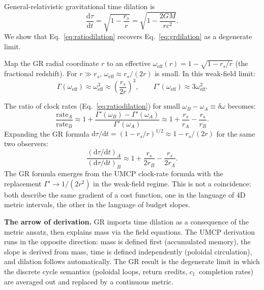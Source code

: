 \documentclass[
  aps,
  prd,
  twocolumn,
  superscriptaddress,
  nofootinbib,
  floatfix
]{revtex4-2}
\newcommand{\Gam}{\Gamma}
\newcommand{\dd}{\mathrm{d}}
\begin{document}
General-relativistic gravitational time dilation is
\begin{equation}
  \frac{\dd\tau}{\dd t}
  = \sqrt{1 - \frac{r_s}{r}}
  = \sqrt{1 - \frac{2GM}{rc^2}}.
  \label{eq:grdilation}
\end{equation}
We show that Eq.~\eqref{eq:ratiodilation} recovers
Eq.~\eqref{eq:grdilation} as a degenerate limit.

Map the GR radial coordinate $r$ to an effective
$\omega_\text{eff}(r) = 1 - \sqrt{1 - r_s/r}$ (the
fractional redshift).  For $r \gg r_s$, $\omega_\text{eff}
\approx r_s/(2r)$ is small.  In this weak-field limit:
\begin{equation}
  \Gam(\omega_\text{eff}) \approx \omega_\text{eff}^3
  \approx \left(\frac{r_s}{2r}\right)^3,
  \qquad
  \Gam'(\omega_\text{eff}) \approx 3\omega_\text{eff}^2.
\end{equation}

The ratio of clock rates (Eq.~\eqref{eq:ratiodilation})
for small $\omega_B - \omega_A \equiv \delta\omega$ becomes:
\begin{equation}
  \frac{\text{rate}_A}{\text{rate}_B}
  \approx 1 + \frac{\Gam'(\omega_B) - \Gam'(\omega_A)}{\Gam'(\omega_A)}
  \approx 1 + \frac{r_s}{r_A} - \frac{r_s}{r_B}.
\end{equation}
Expanding the GR formula $\dd\tau/\dd t = (1-r_s/r)^{1/2}
\approx 1 - r_s/(2r)$ for the same two observers:
\begin{equation}
  \frac{(\dd\tau/\dd t)_A}{(\dd\tau/\dd t)_B}
  \approx 1 + \frac{r_s}{2r_B} - \frac{r_s}{2r_A}.
\end{equation}
The GR formula emerges from the UMCP clock-rate formula
with the replacement $\Gam' \to 1/(2r^2)$ in the
weak-field regime.  This is not a coincidence: both
describe the same gradient of a cost function, one in
the language of 4D metric intervals, the other in the
language of budget slopes.

\textbf{The arrow of derivation.}  GR imports time
dilation as a consequence of the metric ansatz, then
explains mass via the field equations.  The UMCP
derivation runs in the opposite direction: mass is defined
first (accumulated memory), the slope is derived from
mass, time is defined independently (poloidal circulation),
and dilation follows automatically.  The GR result is the
degenerate limit in which the discrete cycle semantics
(poloidal loops, return credits, $c_1$~completion rates)
are averaged out and replaced by a continuous metric.

\end{document}
